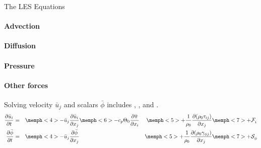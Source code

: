 \author{Thijs Heus}
\begin{frame}[label=equations]{The LES Equations}
\framesubtitle<4>{Advection}
\framesubtitle<5>{Diffusion}
\framesubtitle<6>{Pressure}
\framesubtitle<7>{Other forces}
Solving velocity $\bar{u}_j$ and scalars $\bar{\phi}$ includes , ,  and .
\begin{align*}
\frac{\partial \bar{u}_i}{\partial t} & = 
&\memph<4>{- \bar{u}_j \frac{\partial \bar{u}_i}{\partial x_j} }
&\memph<6>{- c_p \Theta_0 \frac{\partial\bar{\pi}}{\partial x_i}}
&\memph<5>{+ \frac{1}{\rho_0} \frac{\partial (\rho_0 \tau_{ij})} {\partial x_j}}
&\memph<7>{ + \force{i}{} }
\\
\frac{\partial \bar{\phi}}{\partial t} & = 
&\memph<4>{ - \bar{u}_j \frac{\partial  \bar{\phi}}{\partial x_j}} 
&&\memph<5>{+ \frac{1}{\rho_0} \frac{\partial (\rho_0  \gamma_{\phi j})} {\partial x_j}}
&\memph<7>{+\source{\phi}{}}
\end{align*}
\end{frame}
